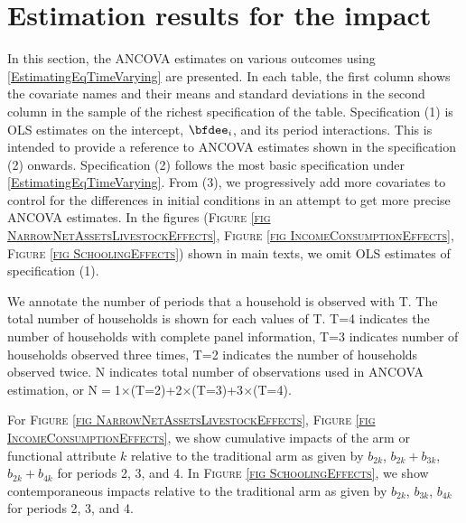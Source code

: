 \section{Estimation results for the impact}
\label{AppendixEstimationTables}
\setcounter{table}{0}

	In this section, the ANCOVA estimates on various outcomes using %
	\eqref{EstimatingEqTimeVarying} are presented. In each table, the first column shows the covariate names and their means and standard deviations in the second column in the sample of the richest specification of the table. Specification (1) is OLS estimates on the intercept, $\bfdee_{i}$, and its period interactions. This is intended to provide a reference to ANCOVA estimates shown in the specification (2) onwards. Specification (2) follows the most basic specification under \eqref{EstimatingEqTimeVarying}. From (3), we progressively add more covariates to control for the differences in initial conditions in an attempt to get more precise ANCOVA estimates. In the figures (\textsc{\footnotesize Figure \ref{fig NarrowNetAssetsLivestockEffects}}, \textsc{\small Figure \ref{fig IncomeConsumptionEffects}}, \textsc{\footnotesize Figure \ref{fig SchoolingEffects}}) shown in main texts, we omit OLS estimates of specification (1). 
	
	We annotate the number of periods that a household is observed with \textsf{T}. The total number of households is shown for each values of \textsf{T}. \textsf{T=4} indicates the number of households with complete panel information, \textsf{T=3} indicates number of households observed three times, \textsf{T=2} indicates the number of households observed twice. \textsf{N} indicates total number of observations used in ANCOVA estimation, or \textsf{N$=$1$\times$(T=2)+2$\times$(T=3)+3$\times$(T=4)}. 
	
	For \textsc{\footnotesize Figure \ref{fig NarrowNetAssetsLivestockEffects}}, \textsc{\small Figure \ref{fig IncomeConsumptionEffects}}, we show cumulative impacts of the arm or functional attribute $k$ relative to the \textsf{traditional} arm as given by $b_{2k}$, $b_{2k}+b_{3k}$,  $b_{2k}+b_{4k}$ for periods 2, 3, and 4. In \textsc{\footnotesize Figure \ref{fig SchoolingEffects}}, we show contemporaneous impacts relative to the \textsf{traditional} arm as given by $b_{2k}$, $b_{3k}$,  $b_{4k}$ for periods 2, 3, and 4.



